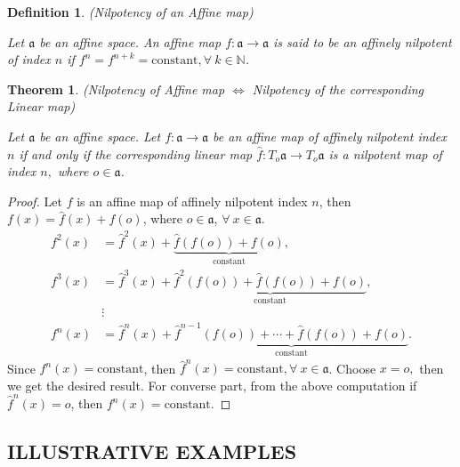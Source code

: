 \documentclass{article}
\newtheorem{definition}{Definition}[section]
\newtheorem{theorem}{Theorem}[section]
\theoremstyle{definition}
\theoremstyle{remark}
\theoremstyle{plain}
\begin{document}
\begin{definition}(Nilpotency of an Affine map)

Let $\mathfrak{a}$ be an affine space. An affine map $f: \mathfrak{a}\rightarrow \mathfrak{a}$ is said to be an affinely nilpotent of index $n$ if $f^{n}=f^{n+k}=\text{constant}, \forall~ k\in \mathbb{N}$.
\end{definition}
\begin{theorem}(Nilpotency of Affine map $\iff$ Nilpotency of the corresponding Linear map)\label{NilpotentAffine1}

Let $\mathfrak{a}$ be an affine space. Let $f:\mathfrak{a}\rightarrow \mathfrak{a}$ be an affine map of affinely nilpotent index $n$ if and only if the corresponding linear map $\hat{f}:T_{o}\mathfrak{a}\rightarrow T_{o}\mathfrak{a}$ is a nilpotent map of index $n,$ where $o\in \mathfrak{a}$.
\end{theorem}
\begin{proof}
    Let $f$ is an affine map of affinely nilpotent index $n$, then $f(x)=\hat{f}(x)+f(o)$, where $o\in \mathfrak{a}$, $\forall~ x\in \mathfrak{a}$. 
    \begin{align*}
        f^2(x)&=\hat{f}^2(x)+\underbrace{\hat{f}(f(o))+f(o)}_{\text{constant}},\\
        f^3(x)&=\hat{f}^3(x)+\underbrace{\hat{f}^2(f(o))+\hat{f}(f(o))+f(o)}_{\text{constant}},\\
        &\vdots\\
        f^n(x)&=\hat{f}^n(x)+\underbrace{\hat{f}^{n-1}(f(o))+\cdots +\hat{f}(f(o))+f(o)}_{\text{constant}}.
    \end{align*}
    Since $f^n(x)=\text{constant}$, then $\hat{f}^n(x)=\text{constant}, \forall~ x\in \mathfrak{a}$. Choose $x=o,$ then we get the desired result. For converse part, from the above computation if $\hat{f}^n(x)=o$, then $f^n(x)=\text{constant}$.
\end{proof}

\subsection{ILLUSTRATIVE EXAMPLES}
\end{document}
